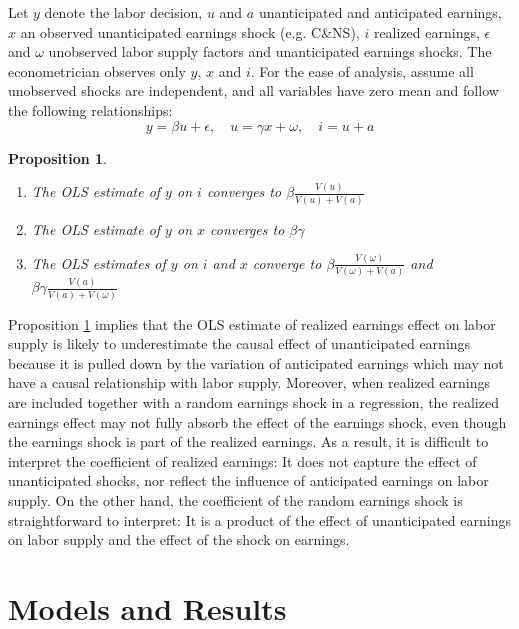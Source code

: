 \documentclass[reviewmode]{restat}
\newtheorem{proposition}{Proposition}
\begin{document}
Let $y$ denote the labor decision, $u$ and $a$ unanticipated and anticipated earnings, $x$ an observed
unanticipated earnings shock (e.g. C\&NS), $i$ realized earnings, $\epsilon$ and $\omega$ unobserved labor
supply factors and unanticipated earnings shocks. The econometrician observes only $y$, $x$ and $i$.
For the ease of analysis, assume all unobserved shocks are independent, and all variables have zero mean 
and follow the following relationships:
\begin{equation*}
    y = \beta u + \epsilon, \quad u = \gamma x + \omega, \quad i = u + a
\end{equation*}
\begin{proposition}
\label{prop:ols1}
\begin{enumerate}
\item[(a)] The OLS estimate of $y$ on $i$ converges to $\beta\frac{V(u)}{V(u) + V(a)}$
\item[(b)] The OLS estimate of $y$ on $x$ converges to $\beta\gamma$
\item[(c)] The OLS estimates of $y$ on $i$ and $x$ converge to $\beta\frac{V(\omega)}{V(\omega) + V(a)}$ and $\beta\gamma\frac{V(a)}{V(a)+V(\omega)}$
\end{enumerate}
\end{proposition}


Proposition \ref{prop:ols1} implies that the OLS estimate of realized earnings effect on labor supply is
likely to underestimate the causal effect of unanticipated earnings because it is pulled down by the variation 
of anticipated earnings which may not have a causal relationship with labor supply. Moreover, when realized
earnings are included together with a random earnings shock in a regression, the realized earnings effect may
not fully absorb the effect of the earnings shock, even though the earnings shock is part of the realized 
earnings. As a result, it is difficult to interpret the coefficient of realized earnings: It does not 
capture the effect of unanticipated shocks, nor reflect the influence of anticipated earnings on labor supply.
On the other hand, the coefficient of the random earnings shock is straightforward to interpret: It is a
product of the effect of unanticipated earnings on labor supply and the effect of the shock on earnings.


\section{Models and Results}
\label{sec:main}
\end{document}
